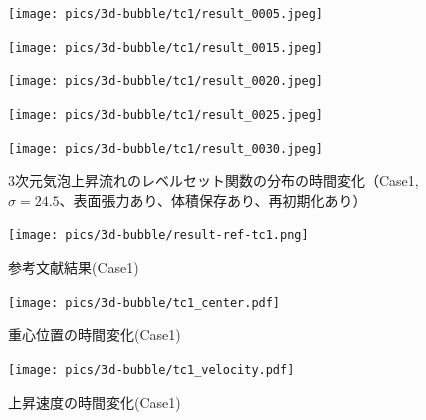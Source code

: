 \begin{figure}[H]
	\centering
	\begin{minipage}[b]{0.16\columnwidth}
	    \centering
	    \texttt{[image: pics/3d-bubble/tc1/result\_0005.jpeg]}
	\end{minipage}
	\begin{minipage}[b]{0.16\columnwidth}
	    \centering
	    \texttt{[image: pics/3d-bubble/tc1/result\_0015.jpeg]}
	\end{minipage}
	\begin{minipage}[b]{0.16\columnwidth}
	    \centering
	    \texttt{[image: pics/3d-bubble/tc1/result\_0020.jpeg]}
	\end{minipage}
	\begin{minipage}[b]{0.16\columnwidth}
	    \centering
	    \texttt{[image: pics/3d-bubble/tc1/result\_0025.jpeg]}
	\end{minipage}
	\begin{minipage}[b]{0.16\columnwidth}
	    \centering
	    \texttt{[image: pics/3d-bubble/tc1/result\_0030.jpeg]}
	\end{minipage}

	\caption{3次元気泡上昇流れのレベルセット関数の分布の時間変化（Case1, $\sigma=24.5$、表面張力あり、体積保存あり、再初期化あり）}
	\label{fig:3d-bubble_result_tc1}
\end{figure}

\begin{figure}[H]
    \centering
	\texttt{[image: pics/3d-bubble/result-ref-tc1.png]}
	\caption{参考文献結果(Case1)\cite{Safi2017}}
	\label{fig:3d-bubble-result-ref}
\end{figure}

\begin{figure}[H]
	\centering
	\begin{minipage}[b]{0.49\columnwidth}
	    \centering
	    \texttt{[image: pics/3d-bubble/tc1\_center.pdf]}
		\caption{重心位置の時間変化(Case1)}
		\label{fig:3d-bubble-center-tc1}
	\end{minipage}
	\begin{minipage}[b]{0.49\columnwidth}
	    \centering
	    \texttt{[image: pics/3d-bubble/tc1\_velocity.pdf]}
		\caption{上昇速度の時間変化(Case1)}
		\label{fig:3d-bubble-velocity-tc1}
	\end{minipage}
\end{figure}


